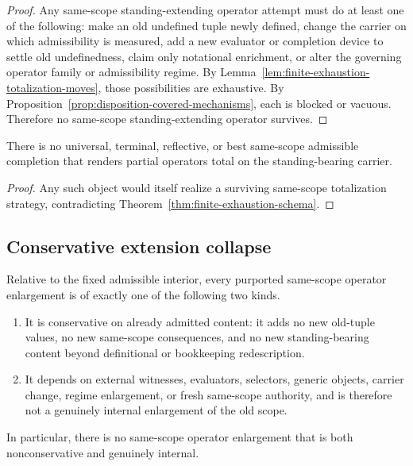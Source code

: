 \begin{proof}
Any same-scope standing-extending operator attempt must do at least one of the following: make an old undefined tuple newly defined, change the carrier on which admissibility is measured, add a new evaluator or completion device to settle old undefinedness, claim only notational enrichment, or alter the governing operator family or admissibility regime. By Lemma~\ref{lem:finite-exhaustion-totalization-moves}, those possibilities are exhaustive. By Proposition~\ref{prop:disposition-covered-mechanisms}, each is blocked or vacuous. Therefore no same-scope standing-extending operator survives.
\end{proof}

\begin{corollary}
There is no universal, terminal, reflective, or best same-scope admissible completion that renders partial operators total on the standing-bearing carrier.
\end{corollary}

\begin{proof}
Any such object would itself realize a surviving same-scope totalization strategy, contradicting Theorem~\ref{thm:finite-exhaustion-schema}.
\end{proof}

\subsection{Conservative extension collapse}

\begin{theorem}
\label{thm:conservative-extension-collapse}
Relative to the fixed admissible interior, every purported same-scope operator enlargement is of exactly one of the following two kinds.
\begin{enumerate}
  \item It is conservative on already admitted content: it adds no new old-tuple values, no new same-scope consequences, and no new standing-bearing content beyond definitional or bookkeeping redescription.
  \item It depends on external witnesses, evaluators, selectors, generic objects, carrier change, regime enlargement, or fresh same-scope authority, and is therefore not a genuinely internal enlargement of the old scope.
\end{enumerate}
In particular, there is no same-scope operator enlargement that is both nonconservative and genuinely internal.
\end{theorem}

